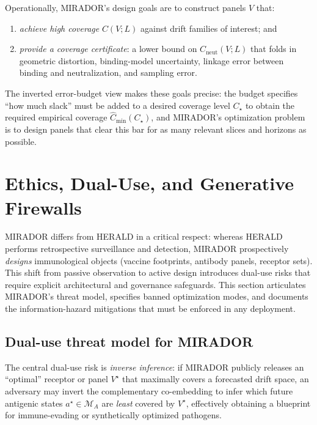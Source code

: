 \documentclass[11pt]{article}
\begin{document}
Operationally, MIRADOR's design goals are to construct panels $V$ that:
\begin{enumerate}
\item \emph{achieve high coverage} $C(V;L)$ against drift families of interest; and
\item \emph{provide a coverage certificate}: a lower bound on $C_{\mathrm{neut}}(V;L)$ that folds
in geometric distortion, binding-model uncertainty, linkage error between binding and
neutralization, and sampling error.
\end{enumerate}
The inverted error-budget view makes these goals precise: the budget specifies ``how much slack''
must be added to a desired coverage level $C_\star$ to obtain the required empirical coverage
$\widehat{C}_{\min}(C_\star)$, and MIRADOR's optimization problem is to design panels that clear
this bar for as many relevant slices and horizons as possible.

\section{Ethics, Dual-Use, and Generative Firewalls}
\label{sec:ethics-dual-use}

MIRADOR differs from HERALD in a critical respect: whereas HERALD performs retrospective
surveillance and detection, MIRADOR prospectively \emph{designs} immunological objects (vaccine
footprints, antibody panels, receptor sets). This shift from passive observation to active design
introduces dual-use risks that require explicit architectural and governance safeguards. This
section articulates MIRADOR's threat model, specifies banned optimization modes, and documents
the information-hazard mitigations that must be enforced in any deployment.

\subsection{Dual-use threat model for MIRADOR}
\label{subsec:threat-model}

The central dual-use risk is \emph{inverse inference}: if MIRADOR publicly releases an
``optimal'' receptor or panel $V^\star$ that maximally covers a forecasted drift space, an
adversary may invert the complementary co-embedding to infer which future antigenic states
$a^\star \in \mathcal{M}_A$ are \emph{least} covered by $V^\star$, effectively obtaining a
blueprint for immune-evading or synthetically optimized pathogens.
\end{document}

